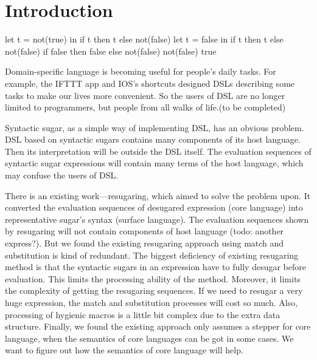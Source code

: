 \section{Introduction}






\begin{Codes}
    let t = not(true) in
      if t then t else not(false)
\CoreStep let t = false in
      if t then t else not(false)
\CoreStep if false then false else not(false)
\CoreStep not(false)
\CoreStep true
\end{Codes}

Domain-specific language\cite{dsl} is becoming useful for people's daily tasks. For example, the IFTTT app and IOS's shortcuts designed DSLs describing some tasks to make our lives more convenient. So the users of DSL are no longer limited to programmers, but people from all walks of life.(to be completed)

Syntactic sugar\cite{syntacticsugar}, as a simple way of implementing DSL, has an obvious problem. DSL based on syntactic sugars contains many components of its host language. Then its interpretation will be outside the DSL itself. The evaluation sequences of syntactic sugar expressions will contain many terms of the host language, which may confuse the users of DSL.

There is an existing work---resugaring\cite{resugaring}\cite{hygienic}, which aimed to solve the problem upon. It converted the evaluation sequences of desugared expression (core language) into representative sugar's syntax (surface language). The evaluation sequences shown by resugaring will not contain components of host language (todo: another express?). But we found the existing resugaring approach using match and substitution is kind of redundant. The biggest deficiency of existing resugaring method is that the syntactic sugars in an expression have to fully desugar before evaluation. This limits the processing ability of the method. Moreover, it limits the complexity of getting the resugaring sequences. If we need to resugar a very huge expression, the match and substitution processes will cost so much. Also, processing of hygienic macros is a little bit complex due to the extra data structure. Finally, we found the existing approach only assumes a stepper for core language, when the semantics of core languages can be got in some cases. We want to figure out how the semantics of core language will help.

